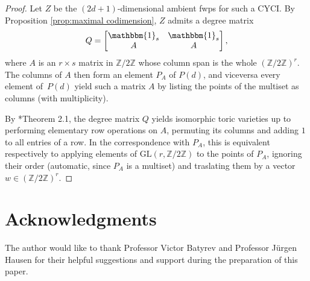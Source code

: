\documentclass{amsart}
\newcommand{\Z}{\mathbb{Z}}
\theoremstyle{definition}
\begin{document}
\begin{proof}
    Let $Z$ be the $(2d+1)$-dimensional ambient fwps for such a CYCI.
    By Proposition \ref{prop:maximal codimension}, $Z$ admits a degree matrix
    $$
    Q = \begin{bmatrix}
    \mathbbm{1}_{s} & \mathbbm{1}_s \\
    A & A
    \end{bmatrix},
    $$
    where $A$ is an $r\times s$ matrix in $\Z/2\Z$ whose column span is the whole $(\Z/2\Z)^r$. The columns of $A$ then form an element $P_A$ of $P(d)$, and viceversa every element of~$P(d)$ yield such a matrix $A$ by listing the points of the multiset as columns (with multiplicity).
    
    By \cite{Ghi}*{Theorem 2.1}, the degree matrix $Q$ yields isomorphic toric varieties up to performing elementary row operations on $A$, permuting its columns and adding $1$ to all entries of a row. In the correspondence with $P_A$, this is equivalent respectively to applying elements of $\text{GL}(r,\Z/2\Z)$ to the points of $P_A$, ignoring their order (automatic, since $P_A$ is a multiset) and traslating them by a vector $w\in(\Z/2\Z)^r$.
\end{proof}

\section*{Acknowledgments}
The author would like to thank Professor Victor Batyrev and Professor J\"urgen Hausen for their helpful suggestions and support during the preparation of this paper.
\end{document}
